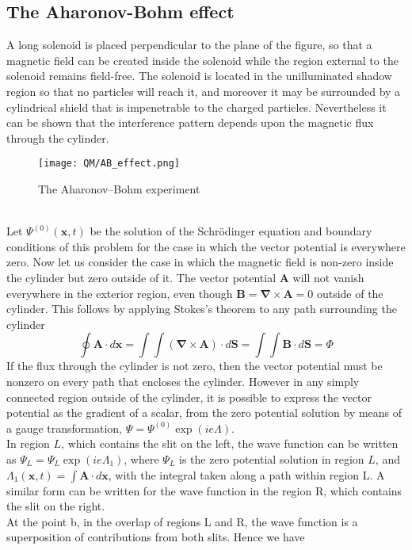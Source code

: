 \subsection{The Aharonov-Bohm effect}
A long solenoid is placed perpendicular to the plane of the figure, so that a magnetic field can be created inside the solenoid while the region external to the solenoid remains field-free. The solenoid is located in the unilluminated shadow region so that no particles will reach it, and moreover it may be surrounded by a cylindrical shield that is impenetrable to the charged particles. Nevertheless it can be shown that the interference pattern depends upon the magnetic flux through the cylinder.\\
\begin{figure}[!h]
	\centering
	\texttt{[image: QM/AB\_effect.png]}
	\caption{The Aharonov–Bohm experiment}
\end{figure}\\
Let $\Psi^{(0)}(\bm{x},t)$ be the solution of the Schrödinger equation and boundary conditions of this problem for the case in which the vector potential is everywhere zero. Now let us consider the case in which the magnetic field is non-zero inside the cylinder but zero outside of it. The vector potential $\bm{A}$ will not vanish everywhere in the exterior region, even though $\bm{B}=\bm{\nabla}\times\bm{A}=0$
outside of the cylinder. This follows by applying Stokes's theorem to any path surrounding the cylinder
\[\oint \bm{A}\cdot d\bm{x} = \int\int (\bm{\nabla}\times\bm{A})\cdot d\bm{S} = \int\int \bm{B}\cdot d\bm{S} = \Phi\]
If the flux through the cylinder is not zero, then the vector potential must be nonzero on every path that encloses the cylinder. However in any simply connected region outside of the cylinder, it is possible to express the vector potential as the gradient of a scalar, from the zero potential solution by means of a gauge transformation, $\Psi = \Psi^{(0)}\exp(ie\Lambda)$.\\
In region $L$, which contains the slit on the left, the wave function can be written as $\Psi_L = \Psi_L\exp(ie\Lambda_1)$, where $\Psi_L$ is the zero potential solution in region $L$, and $\Lambda_1(\bm{x},t) = \int \bm{A}\cdot d\bm{x}$, with the integral taken along a path within region L. A similar form can be written for the wave function in the region R, which contains the slit on the right. \\
At the point b, in the overlap of regions L and R, the wave function is a superposition of contributions from both slits. Hence we have
